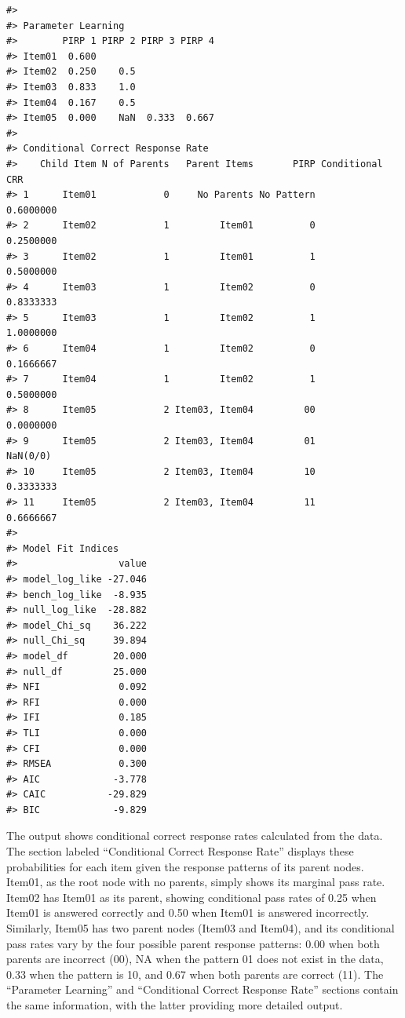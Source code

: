 \begin{verbatim}
#> 
#> Parameter Learning
#>        PIRP 1 PIRP 2 PIRP 3 PIRP 4
#> Item01  0.600                     
#> Item02  0.250    0.5              
#> Item03  0.833    1.0              
#> Item04  0.167    0.5              
#> Item05  0.000    NaN  0.333  0.667
#> 
#> Conditional Correct Response Rate
#>    Child Item N of Parents   Parent Items       PIRP Conditional CRR
#> 1      Item01            0     No Parents No Pattern       0.6000000
#> 2      Item02            1         Item01          0       0.2500000
#> 3      Item02            1         Item01          1       0.5000000
#> 4      Item03            1         Item02          0       0.8333333
#> 5      Item03            1         Item02          1       1.0000000
#> 6      Item04            1         Item02          0       0.1666667
#> 7      Item04            1         Item02          1       0.5000000
#> 8      Item05            2 Item03, Item04         00       0.0000000
#> 9      Item05            2 Item03, Item04         01        NaN(0/0)
#> 10     Item05            2 Item03, Item04         10       0.3333333
#> 11     Item05            2 Item03, Item04         11       0.6666667
#> 
#> Model Fit Indices
#>                  value
#> model_log_like -27.046
#> bench_log_like  -8.935
#> null_log_like  -28.882
#> model_Chi_sq    36.222
#> null_Chi_sq     39.894
#> model_df        20.000
#> null_df         25.000
#> NFI              0.092
#> RFI              0.000
#> IFI              0.185
#> TLI              0.000
#> CFI              0.000
#> RMSEA            0.300
#> AIC             -3.778
#> CAIC           -29.829
#> BIC             -9.829
\end{verbatim}

The output shows conditional correct response rates calculated from the data. The section labeled ``Conditional Correct Response Rate'' displays these probabilities for each item given the response patterns of its parent nodes. Item01, as the root node with no parents, simply shows its marginal pass rate. Item02 has Item01 as its parent, showing conditional pass rates of 0.25 when Item01 is answered correctly and 0.50 when Item01 is answered incorrectly. Similarly, Item05 has two parent nodes (Item03 and Item04), and its conditional pass rates vary by the four possible parent response patterns: 0.00 when both parents are incorrect (00), NA when the pattern 01 does not exist in the data, 0.33 when the pattern is 10, and 0.67 when both parents are correct (11). The ``Parameter Learning'' and ``Conditional Correct Response Rate'' sections contain the same information, with the latter providing more detailed output.

